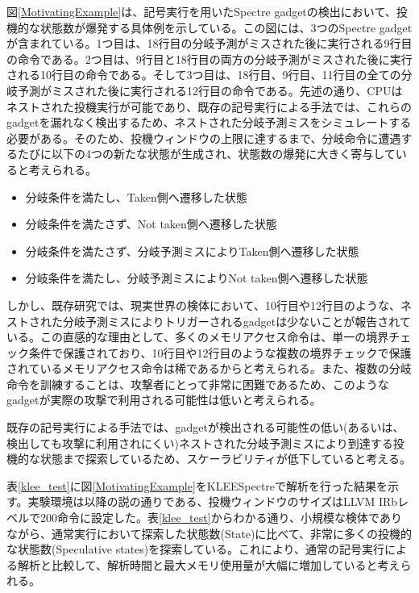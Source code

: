 図\ref{MotivatingExample}は、記号実行を用いたSpectre gadgetの検出において、投機的な状態数が爆発する具体例を示している。この図には、3つのSpectre gadgetが含まれている。1つ目は、18行目の分岐予測がミスされた後に実行される9行目の命令である。2つ目は、9行目と18行目の両方の分岐予測がミスされた後に実行される10行目の命令である。そして3つ目は、18行目、9行目、11行目の全ての分岐予測がミスされた後に実行される12行目の命令である。先述の通り、CPUはネストされた投機実行が可能であり、既存の記号実行による手法\cite{guarnieri2020spectector,wang2020kleespectre}では、これらのgadgetを漏れなく検出するため、ネストされた分岐予測ミスをシミュレートする必要がある。そのため、投機ウィンドウの上限に達するまで、分岐命令に遭遇するたびに以下の4つの新たな状態が生成され、状態数の爆発に大きく寄与していると考えられる。\par

\begin{itemize}
  \item 分岐条件を満たし、Taken側へ遷移した状態
  \item 分岐条件を満たさず、Not taken側へ遷移した状態
  \item 分岐条件を満たさず、分岐予測ミスによりTaken側へ遷移した状態  
  \item 分岐条件を満たし、分岐予測ミスによりNot taken側へ遷移した状態
\end{itemize}

しかし、既存研究\cite{oleksenko2020specfuzz}では、現実世界の検体において、10行目や12行目のような、ネストされた分岐予測ミスによりトリガーされるgadgetは少ないことが報告されている。この直感的な理由として、多くのメモリアクセス命令は、単一の境界チェック条件で保護されており、10行目や12行目のような複数の境界チェックで保護されているメモリアクセス命令は稀であるからと考えられる。また、複数の分岐命令を訓練することは、攻撃者にとって非常に困難であるため、このようなgadgetが実際の攻撃で利用される可能性は低いと考えられる。\par
既存の記号実行による手法では、gadgetが検出される可能性の低い(あるいは、検出しても攻撃に利用されにくい)ネストされた分岐予測ミスにより到達する投機的な状態まで探索しているため、スケーラビリティが低下していると考える。\par

表\ref{klee_test}に図\ref{MotivatingExample}をKLEESpectreで解析を行った結果を示す。実験環境は以降の説の通りである、投機ウィンドウのサイズはLLVM IRbレベルで200命令に設定した。表\ref{klee_test}からわかる通り、小規模な検体でありながら、通常実行において探索した状態数(State)に比べて、非常に多くの投機的な状態数(Speculative states)を探索している。これにより、通常の記号実行による解析と比較して、解析時間と最大メモリ使用量が大幅に増加していると考えられる。\par

